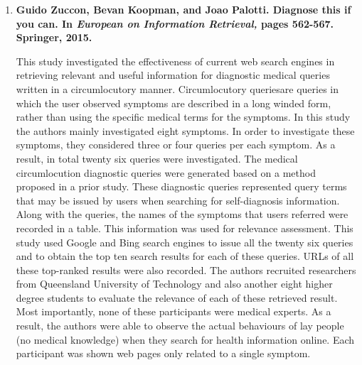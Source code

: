 \documentclass[]{article}
\begin{document}
\begin{enumerate}
 \renewcommand\labelenumi{\bfseries\theenumi .}
\item { \textbf{Guido Zuccon, Bevan Koopman, and Joao Palotti. Diagnose this if you can. In \textit{European on Information Retrieval,} pages 562-567. Springer, 2015.}}

This study investigated the effectiveness of current web search engines in retrieving relevant and useful information for diagnostic medical queries written in a circumlocutory manner. \textquotesingle Circumlocutory queries\textquotesingle are queries in which the user observed symptoms are described in a long winded form, rather than using the specific medical terms for the symptoms. In this study the authors mainly investigated eight symptoms. In order to investigate these symptoms, they considered three or four queries per each symptom. As a result, in total twenty six queries were investigated. The  medical circumlocution diagnostic queries were generated based on a method proposed in a prior study. These diagnostic queries represented query terms that may be issued by users when searching for self-diagnosis information.  Along with the queries, the names of the symptoms that users referred were recorded in a table. This information was used for relevance assessment. This study used Google and Bing search engines to issue all the twenty six queries and to obtain the top ten search results for each of these queries. URLs of all these top-ranked results were also recorded. The authors recruited researchers from Queensland University of Technology and also another eight higher degree students to evaluate the relevance of each of these retrieved result. Most importantly, none of these participants were medical experts. As a result, the authors were able to observe the actual behaviours of lay people (no medical knowledge) when they search for health information online. Each participant was shown web pages only related to a single symptom. 


\end{enumerate}
\end{document}
